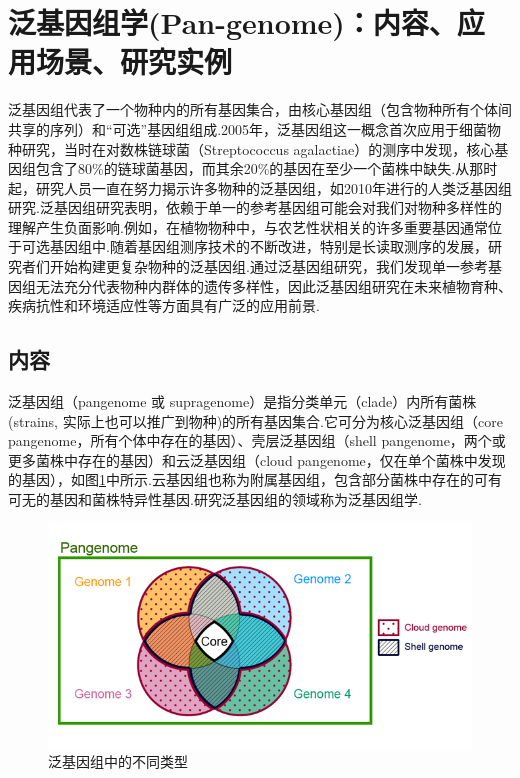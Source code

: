 
\section{泛基因组学(Pan-genome)：内容、应用场景、研究实例}
泛基因组代表了一个物种内的所有基因集合，由核心基因组（包含物种所有个体间共享的序列）和“可选”基因组组成.2005年，泛基因组这一概念首次应用于细菌物种研究\cite{tettelin2005genome}，当时在对数株链球菌（Streptococcus agalactiae）的测序中发现，核心基因组包含了80\%的链球菌基因，而其余20\%的基因在至少一个菌株中缺失.从那时起，研究人员一直在努力揭示许多物种的泛基因组，如2010年进行的人类泛基因组研究\cite{li2009human}.泛基因组研究表明，依赖于单一的参考基因组可能会对我们对物种多样性的理解产生负面影响.例如，在植物物种中\cite{Bayer2020PlantPA}，与农艺性状相关的许多重要基因通常位于可选基因组中.随着基因组测序技术的不断改进，特别是长读取测序的发展，研究者们开始构建更复杂物种的泛基因组.通过泛基因组研究，我们发现单一参考基因组无法充分代表物种内群体的遗传多样性，因此泛基因组研究在未来植物育种、疾病抗性和环境适应性等方面具有广泛的应用前景.

\subsection{内容}
泛基因组（pangenome 或 supragenome）是指分类单元（clade）内所有菌株(strains, 实际上也可以推广到物种)的所有基因集合.它可分为核心泛基因组（core pangenome，所有个体中存在的基因）、壳层泛基因组（shell pangenome，两个或更多菌株中存在的基因）和云泛基因组（cloud pangenome，仅在单个菌株中发现的基因），如图\ref{Parts_of_the_pangenome}中所示.云基因组也称为附属基因组，包含部分菌株中存在的可有可无的基因和菌株特异性基因.研究泛基因组的领域称为泛基因组学.

\begin{figure}[htp!]
	\centering
	\includegraphics[width=1\linewidth]{figure/Parts_of_the_pangenome}
	\caption{泛基因组中的不同类型} \label{Parts_of_the_pangenome}
\end{figure}


